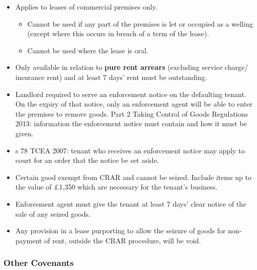\documentclass[
]{article}
\providecommand{\tightlist}{%
  \setlength{\itemsep}{0pt}\setlength{\parskip}{0pt}}
\begin{document}
\begin{itemize}
\tightlist
\item
  Applies to leases of commercial premises only.

  \begin{itemize}
  \tightlist
  \item
    Cannot be used if any part of the premises is let or occupied as a
    welling (except where this occurs in breach of a term of the lease).
  \item
    Cannot be used where the lease is oral.
  \end{itemize}
\item
  Only available in relation to \textbf{pure rent arrears} (excluding
  service charge/ insurance rent) and at least 7 days' rent must be
  outstanding.
\item
  Landlord required to serve an enforcement notice on the defaulting
  tenant. On the expiry of that notice, only an enforcement agent will
  be able to enter the premises to remove goods. Part 2 Taking Control
  of Goods Regulations 2013: information the enforcement notice must
  contain and how it must be given.
\item
  s 78 TCEA 2007: tenant who receives an enforcement notice may apply to
  court for an order that the notice be set aside.
\item
  Certain good exempt from CRAR and cannot be seized. Include items up
  to the value of £1,350 which are necessary for the tenant's business.
\item
  Enforcement agent must give the tenant at least 7 days' clear notice
  of the sale of any seized goods.
\item
  Any provision in a lease purporting to allow the seizure of goods for
  non-payment of rent, outside the CRAR procedure, will be void.
\end{itemize}

\hypertarget{other-covenants}{%
\subsubsection{Other Covenants}\label{other-covenants}}
\end{document}
